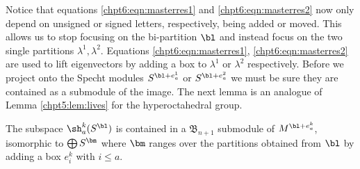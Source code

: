 \documentclass[11pt]{report}
\begin{document}
Notice that equations \eqref{chpt6:eqn:masterres1} and \eqref{chpt6:eqn:masterres2} now only depend on unsigned or signed letters, respectively,  being added or moved. 	
This allows us to stop focusing on the bi-partition $\bl$ and instead focus on the two single partitions $\lambda^{1}, \lambda^{2}$. Equations \eqref{chpt6:eqn:masterres1}, \eqref{chpt6:eqn:masterres2} are used to lift eigenvectors by adding a box to $\lambda^{1}$ or $\lambda^{2}$ respectively. Before we project onto the Specht modules $S^{\bl+e_{a}^{1}}$ or $S^{\bl+e_{a}^{2}}$ we must be sure they are contained as a submodule of the image. The next lemma is an analogue of Lemma \ref{chpt5:lem:lives} for the hyperoctahedral group.

\begin{lemma}
	\label{chpt6:lem:phimapscorrect}
	
	
	
	
	
	
	
	
	
	
	
	
	The subspace $\sh_{a}^{k}(S^{\bl})$ is contained in a 
	$\mathfrak{B}_{n+1}$ submodule of $M^{\bl + e_{a}^{k}}$, 
	isomorphic to $\bigoplus S^{\bm}$ where $\bm$ ranges 
	over the partitions obtained from $\bl$ by adding a box $ e_{i}^{k}$ with $i \leq a$. 	
\end{lemma}
\end{document}
